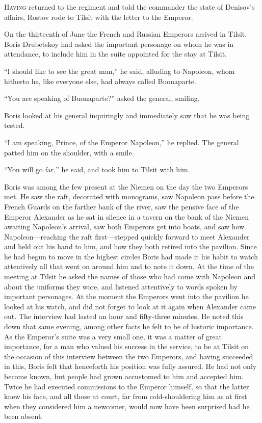 \lettrine[lines=2, loversize=0.3, lraise=0]{\initfamily H}{aving}
returned to the regiment and told the commander the state
of Denisov's affairs, Rostov rode to Tilsit with the letter to
the Emperor.

On the thirteenth of June the French and Russian Emperors arrived
in Tilsit. Boris Drubetskoy had asked the important personage on
whom he was in attendance, to include him in the suite appointed
for the stay at Tilsit.

``I should like to see the great man,'' he said, alluding to
Napoleon, whom hitherto he, like everyone else, had always called
Buonaparte.

``You are speaking of Buonaparte?'' asked the general, smiling.

Boris looked at his general inquiringly and immediately saw that
he was being tested.

``I am speaking, Prince, of the Emperor Napoleon,'' he
replied. The general patted him on the shoulder, with a smile.

``You will go far,'' he said, and took him to Tilsit with him.

Boris was among the few present at the Niemen on the day the two
Emperors met. He saw the raft, decorated with monograms, saw
Napoleon pass before the French Guards on the farther bank of the
river, saw the pensive face of the Emperor Alexander as he sat in
silence in a tavern on the bank of the Niemen awaiting Napoleon's
arrival, saw both Emperors get into boats, and saw how
Napoleon---reaching the raft first---stepped quickly forward to
meet Alexander and held out his hand to him, and how they both
retired into the pavilion. Since he had begun to move in the
highest circles Boris had made it his habit to watch attentively
all that went on around him and to note it down. At the time of
the meeting at Tilsit he asked the names of those who had come
with Napoleon and about the uniforms they wore, and listened
attentively to words spoken by important personages. At the
moment the Emperors went into the pavilion he looked at his
watch, and did not forget to look at it again when Alexander came
out. The interview had lasted an hour and fifty-three minutes. He
noted this down that same evening, among other facts he felt to
be of historic importance. As the Emperor's suite was a very
small one, it was a matter of great importance, for a man who
valued his success in the service, to be at Tilsit on the
occasion of this interview between the two Emperors, and having
succeeded in this, Boris felt that henceforth his position was
fully assured. He had not only become known, but people had grown
accustomed to him and accepted him.  Twice he had executed
commissions to the Emperor himself, so that the latter knew his
face, and all those at court, far from cold-shouldering him as at
first when they considered him a newcomer, would now have been
surprised had he been absent.

